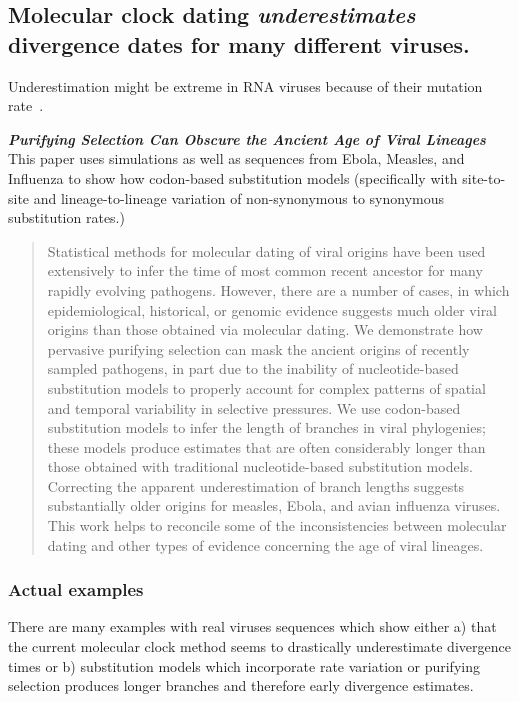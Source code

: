 \subsection*{Molecular clock dating \textit{underestimates} divergence dates for many different viruses.}

Underestimation might be extreme in RNA  viruses because of their mutation rate~\citep{holmes2003molecular}.

\textbf{\textit{Purifying Selection Can Obscure the Ancient Age of Viral Lineages}}\citep{wertheim2011purifying}
This paper uses simulations as well as sequences from Ebola, Measles, and Influenza to show how codon-based substitution models (specifically with site-to-site and lineage-to-lineage variation of non-synonymous to synonymous substitution rates.)
\begin{quote}
Statistical methods for molecular dating of viral origins have been used extensively to infer the time of most common recent ancestor for many rapidly evolving pathogens. However, there are a number of cases, in which epidemiological, historical, or genomic evidence suggests much older viral origins than those obtained via molecular dating. We demonstrate how pervasive purifying selection can mask the ancient origins of recently sampled pathogens, in part due to the inability of nucleotide-based substitution models to properly account for complex patterns of spatial and temporal variability in selective pressures. We use codon-based substitution models to infer the length of branches in viral phylogenies; these models produce estimates that are often considerably longer than those obtained with traditional nucleotide-based substitution models. Correcting the apparent underestimation of branch lengths suggests substantially older origins for measles, Ebola, and avian influenza viruses. This work helps to reconcile some of the inconsistencies between molecular dating and other types of evidence concerning the age of viral lineages.
\end{quote}

\subsubsection*{Actual examples}

There are many examples with real viruses sequences which show either a) that the current molecular clock method seems to drastically underestimate divergence times or b) substitution models which incorporate rate variation or purifying selection produces longer branches and therefore early divergence estimates. 

